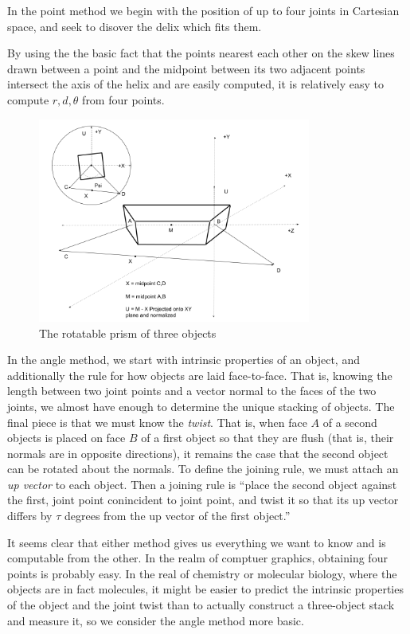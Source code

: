 \documentclass[11pt]{article}
\begin{document}
In the point method we begin with the position of up to four joints in Cartesian space, and
seek to disover the delix which fits them.

By using the the basic fact that the points nearest each other on the skew lines drawn between a point and the midpoint between its two
adjacent points intersect the axis of the helix and are easily computed, it is relatively easy to compute $r,d,\theta$ from four points.

\begin{figure}
     \centering
     \includegraphics[width=0.80\textwidth]{figures/ObjectForStackingSetup.png}
     \caption{The rotatable prism of three objects}
  \label{fig:intrinsicdiagram}
\end{figure}

In the angle method, we start with intrinsic properties of an object, and additionally the
rule for how objects are laid face-to-face. That is, knowing the length between two
joint points and a vector normal to the faces of the two joints, we almost have
enough to determine the unique stacking of objects. The final piece is that we must
know the {\em twist}. That is, when face $A$ of a second objects is placed on face $B$
of a first object so that they are flush (that is, their normals are in opposite directions),
it remains the case that the second object can be rotated about the normals. To
define the joining rule, we must attach an {\em up vector} to each object. Then a joining
rule is ``place the second object against the first, joint point conincident to joint point,
and twist it so that its up vector differs by $\tau$ degrees from the up vector of the first
object.''

It seems clear that either method gives us everything we want to know and is computable
from the other. In the realm of comptuer graphics, obtaining four points is probably easy.
In the real of chemistry or molecular biology, where the objects are in fact molecules,
it might be easier to predict the intrinsic properties of the object and the joint twist
than to actually construct a three-object stack and measure it, so we consider the angle
method more basic.
\end{document}
